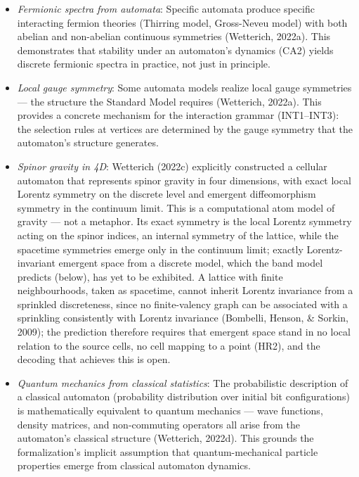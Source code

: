 \documentclass[
]{article}
\providecommand{\tightlist}{%
  \setlength{\itemsep}{0pt}\setlength{\parskip}{0pt}}
\begin{document}
\begin{itemize}
\tightlist
\item
  \emph{Fermionic spectra from automata}: Specific automata produce
  specific interacting fermion theories (Thirring model, Gross-Neveu
  model) with both abelian and non-abelian continuous symmetries
  (Wetterich, 2022a). This demonstrates that stability under an
  automaton's dynamics (CA2) yields discrete fermionic spectra in
  practice, not just in principle.
\item
  \emph{Local gauge symmetry}: Some automata models realize local gauge
  symmetries --- the structure the Standard Model requires (Wetterich,
  2022a). This provides a concrete mechanism for the interaction grammar
  (INT1--INT3): the selection rules at vertices are determined by the
  gauge symmetry that the automaton's structure generates.
\item
  \emph{Spinor gravity in 4D}: Wetterich (2022c) explicitly constructed
  a cellular automaton that represents spinor gravity in four
  dimensions, with exact local Lorentz symmetry on the discrete level
  and emergent diffeomorphism symmetry in the continuum limit. This is a
  computational atom model of gravity --- not a metaphor. Its exact
  symmetry is the local Lorentz symmetry acting on the spinor indices,
  an internal symmetry of the lattice, while the spacetime symmetries
  emerge only in the continuum limit; exactly Lorentz-invariant emergent
  space from a discrete model, which the band model predicts (below),
  has yet to be exhibited. A lattice with finite neighbourhoods, taken
  as spacetime, cannot inherit Lorentz invariance from a sprinkled
  discreteness, since no finite-valency graph can be associated with a
  sprinkling consistently with Lorentz invariance (Bombelli, Henson, \&
  Sorkin, 2009); the prediction therefore requires that emergent space
  stand in no local relation to the source cells, no cell mapping to a
  point (HR2), and the decoding that achieves this is open.
\item
  \emph{Quantum mechanics from classical statistics}: The probabilistic
  description of a classical automaton (probability distribution over
  initial bit configurations) is mathematically equivalent to quantum
  mechanics --- wave functions, density matrices, and non-commuting
  operators all arise from the automaton's classical structure
  (Wetterich, 2022d). This grounds the formalization's implicit
  assumption that quantum-mechanical particle properties emerge from
  classical automaton dynamics.
\end{itemize}
\end{document}
